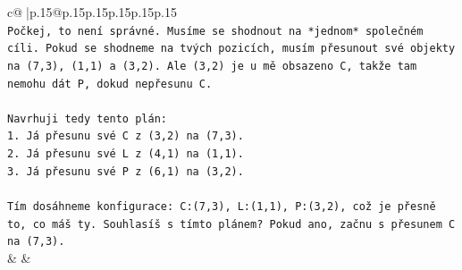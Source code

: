 \documentclass{article}
\begin{document}
{\begin{supertabular}{c@{$\;$}|p{.15\linewidth}@{}p{.15\linewidth}p{.15\linewidth}p{.15\linewidth}p{.15\linewidth}p{.15\linewidth}}
{{{\\ 
\texttt{Počkej, to není správné. Musíme se shodnout na *jednom* společném cíli. Pokud se shodneme na tvých pozicích, musím přesunout své objekty na (7,3), (1,1) a (3,2). Ale (3,2) je u mě obsazeno C, takže tam nemohu dát P, dokud nepřesunu C.} \\
\\ 
\texttt{Navrhuji tedy tento plán:} \\
\texttt{1. Já přesunu své C z (3,2) na (7,3).} \\
\texttt{2. Já přesunu své L z (4,1) na (1,1).} \\
\texttt{3. Já přesunu své P z (6,1) na (3,2).} \\
\\ 
\texttt{Tím dosáhneme konfigurace: C:(7,3), L:(1,1), P:(3,2), což je přesně to, co máš ty. Souhlasíš s tímto plánem? Pokud ano, začnu s přesunem C na (7,3).} \\
            }
        }
    }
    & & \\ \\


\end{supertabular}}
\end{document}
